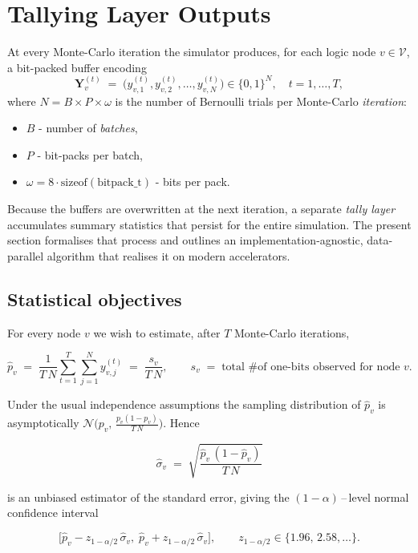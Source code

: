 \section{Tallying Layer Outputs}
\label{sec:tally_kernel}

At every Monte-Carlo iteration the simulator produces, for each logic node
\(v\in \mathcal{V}\), a bit-packed buffer encoding
\[
  \mathbf{Y}_v^{(t)}
  \;=\;
  \bigl(y_{v,1}^{(t)}, y_{v,2}^{(t)},\dots, y_{v,N}^{(t)}\bigr)
  \in\{0,1\}^N,
  \quad t = 1,\dots,T,
\]
where \(N\!=\!B\!\times\!P\!\times\!\omega\) is the number of Bernoulli trials
per Monte-Carlo \emph{iteration}:
\begin{itemize}
    \item \(B\) - number of \emph{batches},
    \item \(P\) - bit-packs per batch,
    \item \(\omega\!=\!8\cdot\mathrm{sizeof}(\text{bitpack\_t})\) - bits per pack.
\end{itemize}
Because the buffers are overwritten at the next iteration, a
separate \emph{tally layer} accumulates summary statistics that persist for the
entire simulation.  The present section formalises that process and outlines
an implementation-agnostic, data-parallel algorithm that realises it on modern
accelerators.

\subsection{Statistical objectives}
\label{subsec:tally_objective}

For every node \(v\) we wish to estimate, after \(T\) Monte-Carlo iterations,

\[
  \widehat{p}_v
  \;=\;
  \frac{1}{T\,N}
  \sum_{t=1}^{T}\sum_{j=1}^{N} y_{v,j}^{(t)}
  \;=\;
  \frac{s_v}{T\,N},
  \qquad
  s_v \;=\; \text{total \# of one-bits observed for node \(v\)}.
\]

Under the usual independence assumptions the sampling distribution of
\(\widehat{p}_v\) is asymptotically
\(\mathcal{N}\!\bigl(p_v,\,
  \tfrac{p_v(1-p_v)}{T\,N}\bigr)\).
Hence

\[
  \widehat{\sigma}_v
  \;=\;
  \sqrt{\frac{\widehat{p}_v\,(1-\widehat{p}_v)}{T\,N}}
\]

is an unbiased estimator of the standard error, giving the
\((1-\alpha)\)\,--\,level normal confidence interval

\[
  \bigl[
    \widehat{p}_v - z_{1-\alpha/2}\,\widehat{\sigma}_v,\;
    \widehat{p}_v + z_{1-\alpha/2}\,\widehat{\sigma}_v
  \bigr],
  \qquad
  z_{1-\alpha/2}\in\{1.96,\,2.58,\dots\}.
\]

